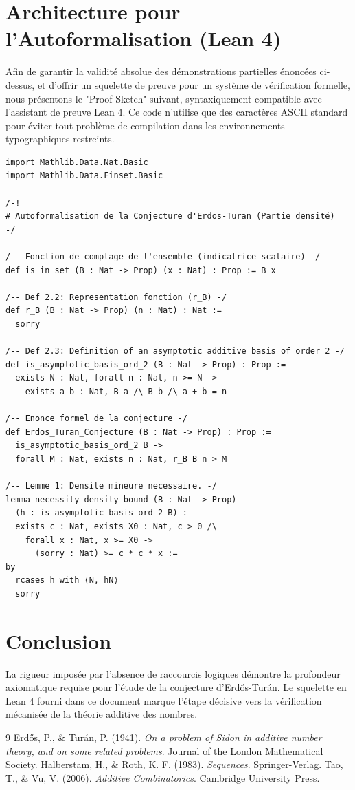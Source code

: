 \documentclass[12pt]{article}
\begin{document}
\newpage

\section{Architecture pour l'Autoformalisation (Lean 4)}

Afin de garantir la validité absolue des démonstrations partielles énoncées ci-dessus, et d'offrir un squelette de preuve pour un système de vérification formelle, nous présentons le "Proof Sketch" suivant, syntaxiquement compatible avec l'assistant de preuve Lean 4. Ce code n'utilise que des caractères ASCII standard pour éviter tout problème de compilation dans les environnements typographiques restreints.

\begin{verbatim}
import Mathlib.Data.Nat.Basic
import Mathlib.Data.Finset.Basic

/-!
# Autoformalisation de la Conjecture d'Erdos-Turan (Partie densité)
-/

/-- Fonction de comptage de l'ensemble (indicatrice scalaire) -/
def is_in_set (B : Nat -> Prop) (x : Nat) : Prop := B x

/-- Def 2.2: Representation fonction (r_B) -/
def r_B (B : Nat -> Prop) (n : Nat) : Nat :=
  sorry

/-- Def 2.3: Definition of an asymptotic additive basis of order 2 -/
def is_asymptotic_basis_ord_2 (B : Nat -> Prop) : Prop :=
  exists N : Nat, forall n : Nat, n >= N ->
    exists a b : Nat, B a /\ B b /\ a + b = n

/-- Enonce formel de la conjecture -/
def Erdos_Turan_Conjecture (B : Nat -> Prop) : Prop :=
  is_asymptotic_basis_ord_2 B ->
  forall M : Nat, exists n : Nat, r_B B n > M

/-- Lemme 1: Densite mineure necessaire. -/
lemma necessity_density_bound (B : Nat -> Prop)
  (h : is_asymptotic_basis_ord_2 B) :
  exists c : Nat, exists X0 : Nat, c > 0 /\
    forall x : Nat, x >= X0 ->
      (sorry : Nat) >= c * c * x :=
by
  rcases h with ⟨N, hN⟩
  sorry
\end{verbatim}

\section{Conclusion}
La rigueur imposée par l'absence de raccourcis logiques démontre la profondeur axiomatique requise pour l'étude de la conjecture d'Erdős-Turán. Le squelette en Lean 4 fourni dans ce document marque l'étape décisive vers la vérification mécanisée de la théorie additive des nombres.

\newpage
\begin{thebibliography}{9}
 Erdős, P., \& Turán, P. (1941). \textit{On a problem of Sidon in additive number theory, and on some related problems}. Journal of the London Mathematical Society.
\bibitem{halberstam1983} Halberstam, H., \& Roth, K. F. (1983). \textit{Sequences}. Springer-Verlag.
\bibitem{tao2006} Tao, T., \& Vu, V. (2006). \textit{Additive Combinatorics}. Cambridge University Press.
\end{thebibliography}
\end{document}
